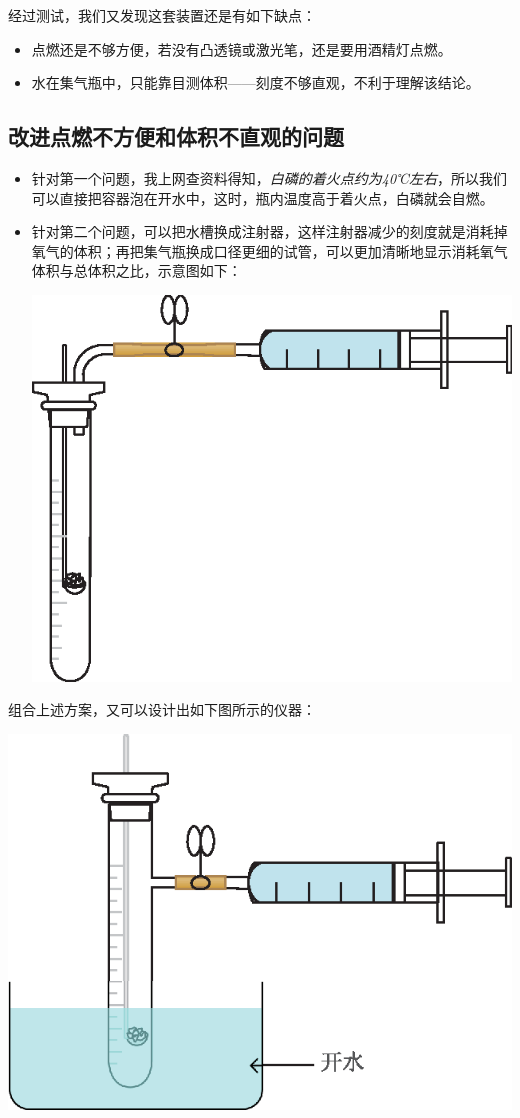 \documentclass[11pt,a4paper,titlepage,twocolumn]{ctexart}
\begin{document}
	经过测试，我们又发现这套装置还是有如下缺点：
	
	\begin{itemize}
		\item 点燃还是不够方便，若没有凸透镜或激光笔，还是要用酒精灯点燃。
		\item 水在集气瓶中，只能靠目测体积——刻度不够直观，不利于理解该结论。
	\end{itemize}
	
	\subsection{改进点燃不方便和体积不直观的问题}
	
	\begin{itemize}
		\item 针对第一个问题，我上网查资料得知，\textit{白磷的着火点约为40℃左右}，所以我们可以直接把容器泡在开水中，这时，瓶内温度高于着火点，白磷就会自燃。
		\item 针对第二个问题，可以把水槽换成注射器，这样注射器减少的刻度就是消耗掉氧气的体积；再把集气瓶换成口径更细的试管，可以更加清晰地显示消耗氧气体积与总体积之比，示意图如下：\\
		\begin{center}
			\includegraphics[width=0.8\linewidth]{fig/4}
		\end{center}
	\end{itemize}
		
	组合上述方案，又可以设计出如下图所示的仪器：
		
	\begin{center}
		\includegraphics[width=0.8\linewidth]{fig/5}
	\end{center}
		
\end{document}
